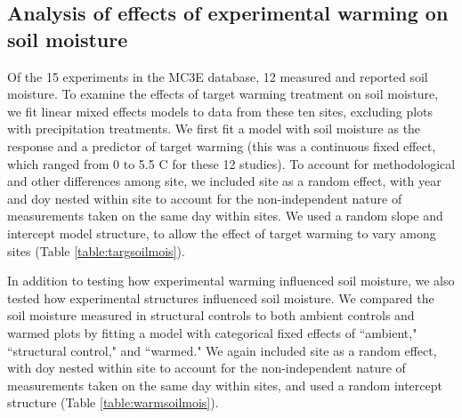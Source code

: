\documentclass{article}
\begin{document}
\subsection* {Analysis of effects of experimental warming on soil moisture}
Of the 15 experiments in the MC3E database, 12 measured and reported soil moisture. To examine the effects of target warming treatment on soil moisture, we fit linear mixed effects models to data from these ten sites, excluding plots with precipitation treatments. We first fit a model with soil moisture as the response and a predictor of target warming (this was a continuous fixed effect, which ranged from 0 to 5.5 \degree C for these 12 studies). To account for methodological and other differences among site, we included site as a random effect, with year and doy nested within site to account for the non-independent nature of measurements taken on the same day within sites.  We used a random slope and intercept model structure, to allow the effect of target warming to vary among sites (Table \ref{table:targsoilmois}). 

\par In addition to testing how experimental warming influenced soil moisture, we also tested how experimental structures influenced soil moisture. We compared the soil moisture measured in structural controls to both ambient controls and warmed plots by fitting a model with categorical fixed effects of ``ambient," ``structural control," and ``warmed."  We again included site as a random effect, with doy nested within site to account for the non-independent nature of measurements taken on the same day within sites, and used a random intercept structure (Table \ref{table:warmsoilmois}). 
\end{document}
